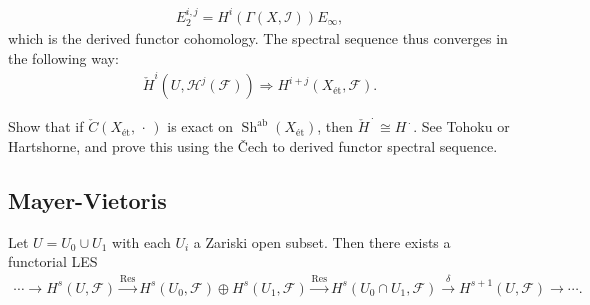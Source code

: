 \begin{align*}  
E_2^{i, j} = H^i(\Gamma(X, \mathcal{I}))  E_{\infty}
,\end{align*}
which is the derived functor cohomology. The spectral sequence thus
converges in the following way:
\begin{align*}  
{\check{H}}^i(U, \mathcal{H}^j(\mathcal{F})) \Rightarrow H^{i+j}(X_\text{ét}, \mathcal{F})
.\end{align*}

\begin{exercise}

Show that if \({\check{C}}(X_\text{ét}, {\,\cdot\,})\) is exact on
\({\operatorname{Sh}}^{{\operatorname{ab}}}(X_\text{ét})\), then
\({\check{H}}^{\,\cdot\,}\cong H^{\,\cdot\,}\). See Tohoku or
Hartshorne, and prove this using the Čech to derived functor spectral
sequence.

\end{exercise}

\hypertarget{mayer-vietoris}{%
\subsection{Mayer-Vietoris}\label{mayer-vietoris}}

\begin{proposition}[?]

Let \(U = U_0 \cup U_1\) with each \(U_i\) a Zariski open subset. Then
there exists a functorial LES
\begin{align*}  
\cdots \to
H^s(U, \mathcal{F}) \xrightarrow{\operatorname{Res}} 
H^s(U_0, \mathcal{F}) \oplus H^s(U_1, \mathcal{F}) \xrightarrow{\operatorname{Res}} 
H^s(U_0 \cap U_1, \mathcal{F}) \xrightarrow{\delta}
H^{s+1}(U, \mathcal{F}) \to 
\cdots
.\end{align*}

\end{proposition}

